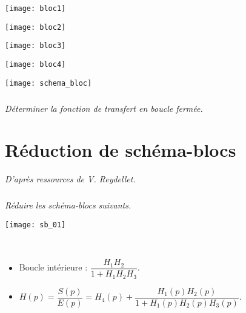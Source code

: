 \begin{multicols}{2}
\begin{corrige}
\begin{minipage}[c]{.23\linewidth}
\begin{center}
\texttt{[image: bloc1]}
\end{center}
\end{minipage}\hfill
\begin{minipage}[c]{.23\linewidth}
\begin{center}
\texttt{[image: bloc2]}
\end{center}
\end{minipage}\hfill
\begin{minipage}[c]{.23\linewidth}
\begin{center}
\texttt{[image: bloc3]}
\end{center}
\end{minipage}\hfill
\begin{minipage}[c]{.23\linewidth}
\begin{center}
\texttt{[image: bloc4]}
\end{center}
\end{minipage}



\begin{center}
\texttt{[image: schema\_bloc]}
\end{center}
\end{corrige}
\else 
\fi


\subparagraph{}
\textit{Déterminer la fonction de transfert en boucle fermée.}





\section*{Réduction de schéma-blocs}
\textit{D'après ressources de V. Reydellet.}
\subparagraph*{}
\textit{Réduire les schéma-blocs suivants.}
\begin{center}
\texttt{[image: sb\_01]}
\end{center}

\ifprof
\begin{corrige}
~\\
\begin{itemize}
\item Boucle intérieure : $\dfrac{H_1H_2}{1+H_1H_2H_3}$.
\item $H(p)=\dfrac{S(p)}{E(p)}=H_4(p)+\dfrac{H_1(p)H_2(p)}{1+H_1(p)H_2(p)H_3(p)}$.
\end{itemize}
\end{corrige}
\else
\fi


\end{multicols}
